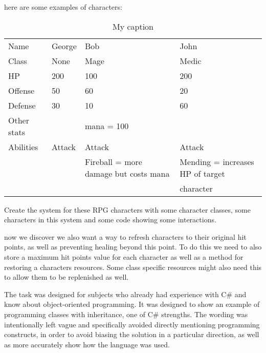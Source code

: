 here are some examples of characters:
\begin{table}[]
\caption{My caption}
\label{my-label}
\begin{tabular}{llll}
Name        & George & Bob                                   & John                                      \\
Class       & None   & Mage                                  & Medic                                     \\
HP          & 200    & 100                                   & 200                                       \\
Offense     & 50     & 60                                    & 20                                        \\
Defense     & 30     & 10                                    & 60                                        \\
Other stats &        & mana = 100                            &                                           \\
Abilities   & Attack & Attack                                & Attack                                    \\
            &        & Fireball = more damage but costs mana & Mending = increases HP of target          \\
            &        &                                       & character
\end{tabular}
\end{table}

Create the system for these RPG characters with some character classes, some characters in this system and some code showing some interactions.

now we discover we also want a way to refresh characters to their original hit points, as well as preventing healing beyond this point.
To do this we need to also store a maximum hit points value for each character as well as a method for restoring a characters resources.
Some class specific resources might also need this to allow them to be replenished as well.

The task was designed for subjects who already had experience with C\# and know about object-oriented programming.
It was designed to show an example of programming classes with inheritance, one of C\# strengths.
The wording was intentionally left vague and specifically avoided directly mentioning programming constructs, in order to avoid biasing the solution in a particular direction, as well as more accurately show how the language was used.